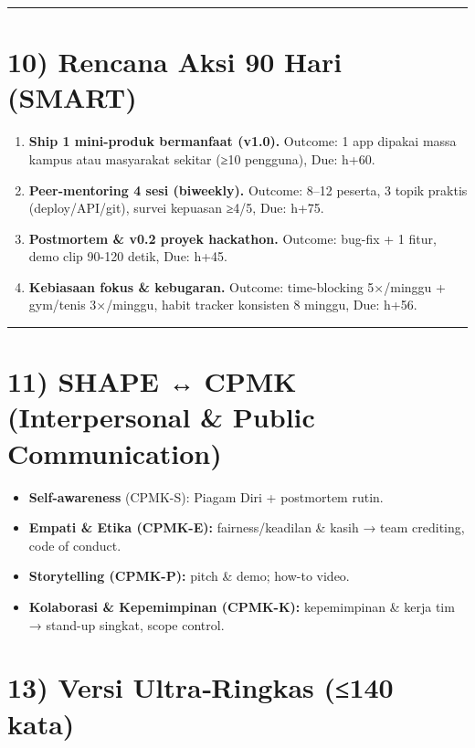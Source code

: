\documentclass[
  letterpaper,
  DIV=11,
  numbers=noendperiod]{scrreprt}
\begin{document}
\begin{center}\rule{0.5\linewidth}{0.5pt}\end{center}

\section{10) Rencana Aksi 90 Hari
(SMART)}\label{rencana-aksi-90-hari-smart}

\begin{enumerate}
\def\labelenumi{\arabic{enumi}.}
\item
  \textbf{Ship 1 mini-produk bermanfaat (v1.0).} Outcome: 1 app dipakai
  massa kampus atau masyarakat sekitar (≥10 pengguna), Due: h+60.
\item
  \textbf{Peer-mentoring 4 sesi (biweekly).} Outcome: 8--12 peserta, 3
  topik praktis (deploy/API/git), survei kepuasan ≥4/5, Due: h+75.
\item
  \textbf{Postmortem \& v0.2 proyek hackathon.} Outcome: bug-fix + 1
  fitur, demo clip 90-120 detik, Due: h+45.
\item
  \textbf{Kebiasaan fokus \& kebugaran.} Outcome: time-blocking
  5×/minggu + gym/tenis 3×/minggu, habit tracker konsisten 8 minggu,
  Due: h+56.
\end{enumerate}

\begin{center}\rule{0.5\linewidth}{0.5pt}\end{center}

\section{11) SHAPE ↔ CPMK (Interpersonal \& Public
Communication)}\label{shape-cpmk-interpersonal-public-communication}

\begin{itemize}
\item
  \textbf{Self-awareness} (CPMK-S): Piagam Diri + postmortem rutin.
\item
  \textbf{Empati \& Etika (CPMK-E):} fairness/keadilan \& kasih → team
  crediting, code of conduct.
\item
  \textbf{Storytelling (CPMK-P):} pitch \& demo; how-to video.
\item
  \textbf{Kolaborasi \& Kepemimpinan (CPMK-K):} kepemimpinan \& kerja
  tim → stand-up singkat, scope control.
\end{itemize}

\section{13) Versi Ultra‑Ringkas (≤140
kata)}\label{versi-ultraringkas-140-kata}
\end{document}
